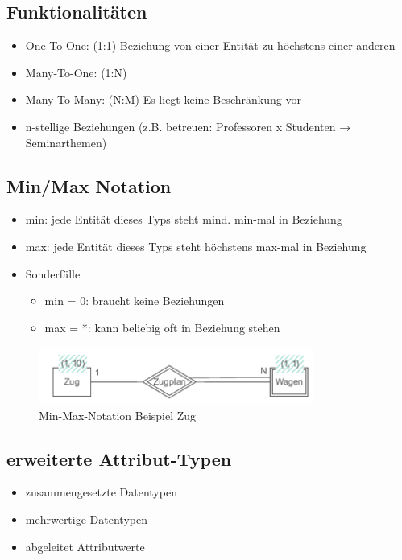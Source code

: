 \documentclass[a4paper]{article}
\begin{document}
\subsection{Funktionalitäten}
\begin{itemize}
    \item One-To-One: (1:1) Beziehung von einer Entität zu höchstens einer anderen  
    \item Many-To-One: (1:N) 
    \item Many-To-Many: (N:M) Es liegt keine Beschränkung vor
    \item n-stellige Beziehungen (z.B. betreuen: Professoren x Studenten → Seminarthemen)
\end{itemize}

\subsection{Min/Max Notation}
\begin{itemize}
    \item min: jede Entität dieses Typs steht mind. min-mal in Beziehung
    \item max: jede Entität dieses Typs steht höchstens max-mal in Beziehung
    \item Sonderfälle
    \begin{itemize}
        \item min = 0: braucht keine Beziehungen
        \item max = *: kann beliebig oft in Beziehung stehen
    \end{itemize}
\end{itemize}

\begin{figure}[htp]
    \centering
    \includegraphics[width=9cm]{images/MinMaxNotation.png}
    \caption{Min-Max-Notation Beispiel Zug}
    \label{fig:MinMaxNotation}
\end{figure}

\subsection{erweiterte Attribut-Typen}
\begin{itemize}
    \item zusammengesetzte Datentypen
    \item mehrwertige Datentypen
    \item abgeleitet Attributwerte
\end{itemize}
\end{document}

